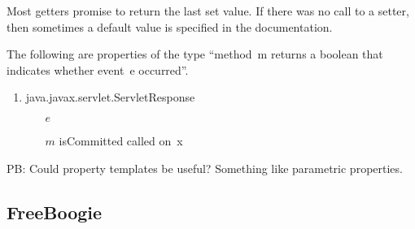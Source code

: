 \documentclass{article} %
\begin{document}
Most getters promise to return the last set value.
If there was no call to a setter, then sometimes a default value is specified in the documentation.

The following are properties of the type ``method~\textsf{m} returns a boolean that indicates whether event~\textsf{e} occurred''.

\begin{enumerate}
\item
\textsf{java.javax.servlet.ServletResponse}
  \begin{itemize}
  \item[$e$] 
  \item[$m$] \textsf{isCommitted} called on~\textsf{x}
  \end{itemize}
\end{enumerate}

PB: Could property templates be useful?
Something like parametric properties.

\subsection{FreeBoogie} %

\end{document}
